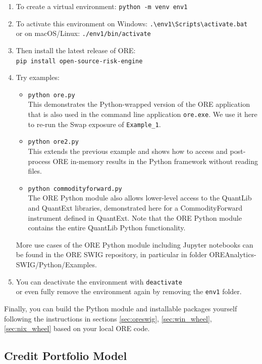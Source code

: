 \documentclass[12pt, a4paper]{article}
\newcommand{\bs}{\textbackslash}
\begin{document}
\begin{enumerate}
\item To create a virtual environment: {\tt python -m venv env1} 
\item To activate this environment on Windows: {\tt .{\bs}env1{\bs}Scripts{\bs}activate.bat}  \\
or on macOS/Linux: {\tt ./env1/bin/activate }  
\item Then install the latest release of ORE:\\
{\tt pip install open-source-risk-engine } 
\item Try examples:\\
	\begin{itemize} 
	\item {\tt python ore.py} \\
	This demonstrates the Python-wrapped version of the ORE application that is also used in the command line application {\tt ore.exe}. We use it here to re-run the Swap exposure of {\tt Example\_1}. 
	\item {\tt python ore2.py} \\
	This extends the previous example and shows how to access and post-process ORE in-memory results in the Python framework without reading files. 
	\item {\tt python commodityforward.py} \\
	The ORE Python module also allows lower-level access to the QuantLib and QuantExt libraries, demonstrated here for a CommodityForward instrument defined in QuantExt. 
	Note that the ORE Python module contains the entire QuantLib Python functionality.
	\end{itemize}
	More use cases of the ORE Python module including Jupyter notebooks can be found in the ORE SWIG repository, in particular in folder OREAnalytics-SWIG/Python/Examples. 
\item You can deactivate the environment with {\tt deactivate} \\
or even fully remove the environment again by removing the {\tt env1} folder.
\end{enumerate}

Finally, you can build the Python module and installable packages yourself following the instructions in sections \ref{sec:oreswig}, \ref{sec:win_wheel}, \ref{sec:nix_wheel}
based on your local ORE code. 

\subsection{Credit Portfolio Model}%
\label{example:43}
\end{document}
